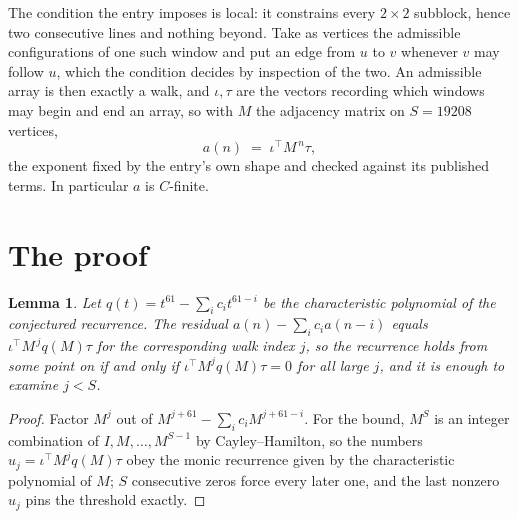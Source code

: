 \documentclass[11pt,a4paper]{article}
\theoremstyle{plain}
\newtheorem{lemma}[theorem]{Lemma}
\theoremstyle{definition}
\begin{document}
The condition the entry imposes is local: it constrains every $2\times2$ subblock, hence two consecutive lines and nothing beyond. Take as vertices the admissible configurations of one such window and put an edge from $u$ to $v$ whenever $v$ may follow $u$, which the condition decides by inspection of the two.
An admissible array is then exactly a walk, and $\iota,\tau$ are the vectors recording which windows may begin and end an array, so with $M$ the adjacency matrix on $S=19208$ vertices,
\[
a(n)\;=\;\iota^{\!\top}M^{\,n}\tau ,
\]
the exponent fixed by the entry's own shape and checked against its published terms. In
particular $a$ is $C$-finite.

\section{The proof}

\begin{lemma}\label{lem:crit}
Let $q(t)=t^{61}-\sum_i c_it^{61-i}$ be the characteristic polynomial of the
conjectured recurrence. The residual $a(n)-\sum_ic_ia(n-i)$ equals
$\iota^{\!\top}M^{\,j}q(M)\tau$ for the corresponding walk index $j$, so the recurrence
holds from some point on if and only if $\iota^{\!\top}M^{j}q(M)\tau=0$ for all large $j$,
and it is enough to examine $j<S$.
\end{lemma}

\begin{proof}
Factor $M^{j}$ out of $M^{j+61}-\sum_ic_iM^{j+61-i}$. For the bound, $M^{S}$
is an integer combination of $I,M,\dots,M^{S-1}$ by Cayley--Hamilton, so the numbers
$u_j=\iota^{\!\top}M^{j}q(M)\tau$ obey the monic recurrence given by the characteristic
polynomial of $M$; $S$ consecutive zeros force every later one, and the last nonzero $u_j$
pins the threshold exactly.
\end{proof}
\end{document}
